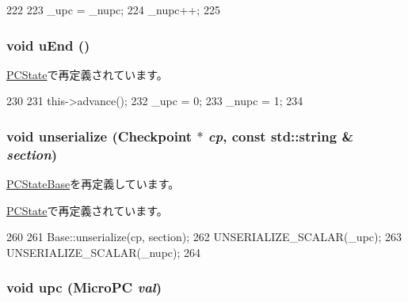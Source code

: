 \begin{DoxyCode}
222     {
223         _upc = _nupc;
224         _nupc++;
225     }
\end{DoxyCode}
\hypertarget{classGenericISA_1_1UPCState_a2f3cdfc88ed61928bd28242996e0f86e}{
\subsubsection[{uEnd}]{\setlength{\rightskip}{0pt plus 5cm}void uEnd ()}}
\label{classGenericISA_1_1UPCState_a2f3cdfc88ed61928bd28242996e0f86e}


\hyperlink{classX86ISA_1_1PCState_a2f3cdfc88ed61928bd28242996e0f86e}{PCState}で再定義されています。


\begin{DoxyCode}
230     {
231         this->advance();
232         _upc = 0;
233         _nupc = 1;
234     }
\end{DoxyCode}
\hypertarget{classGenericISA_1_1UPCState_af22e5d6d660b97db37003ac61ac4ee49}{
\subsubsection[{unserialize}]{\setlength{\rightskip}{0pt plus 5cm}void unserialize ({\bf Checkpoint} $\ast$ {\em cp}, \/  const std::string \& {\em section})}}
\label{classGenericISA_1_1UPCState_af22e5d6d660b97db37003ac61ac4ee49}


\hyperlink{classGenericISA_1_1PCStateBase_af22e5d6d660b97db37003ac61ac4ee49}{PCStateBase}を再定義しています。

\hyperlink{classX86ISA_1_1PCState_af22e5d6d660b97db37003ac61ac4ee49}{PCState}で再定義されています。


\begin{DoxyCode}
260     {
261         Base::unserialize(cp, section);
262         UNSERIALIZE_SCALAR(_upc);
263         UNSERIALIZE_SCALAR(_nupc);
264     }
\end{DoxyCode}
\hypertarget{classGenericISA_1_1UPCState_ae13f8fb6bc07c4a7ac4af3496277000c}{
\subsubsection[{upc}]{\setlength{\rightskip}{0pt plus 5cm}void upc ({\bf MicroPC} {\em val})}}
\label{classGenericISA_1_1UPCState_ae13f8fb6bc07c4a7ac4af3496277000c}



